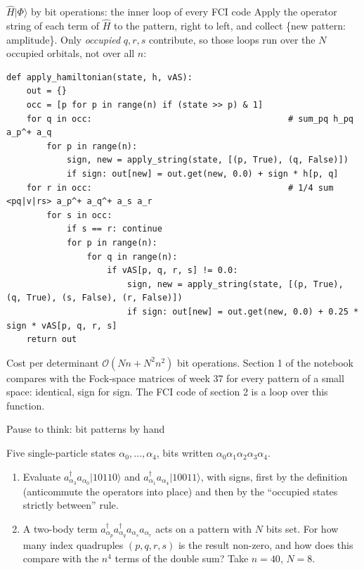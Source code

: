 \documentclass[aspectratio=169,10pt]{beamer}
\newcounter{thinkctr}
\newcommand{\thinkq}[2]{%
  \stepcounter{thinkctr}%
  \begin{tcolorbox}[colback=palewarm,colframe=warm,title={\bfseries Pause to think \#\thethinkctr\hfill\mdseries\small(about #1 min -- discuss with your neighbour)},fonttitle=\bfseries]
  #2
  \end{tcolorbox}}
\newcommand{\ket}[1]{\vert #1\rangle}
\begin{document}
\begin{frame}[fragile]{$\hat{H}\ket{\Phi}$ by bit operations: the inner loop of every FCI code}
  \small
  Apply the operator string of each term of $\hat{H}$ to the pattern, right to left, and collect \{new pattern: amplitude\}. Only \emph{occupied} $q,r,s$ contribute, so those loops run over the $N$ occupied orbitals, not over all $n$:
\begin{lstlisting}
def apply_hamiltonian(state, h, vAS):
    out = {}
    occ = [p for p in range(n) if (state >> p) & 1]
    for q in occ:                                       # sum_pq h_pq a_p^+ a_q
        for p in range(n):
            sign, new = apply_string(state, [(p, True), (q, False)])
            if sign: out[new] = out.get(new, 0.0) + sign * h[p, q]
    for r in occ:                                       # 1/4 sum <pq|v|rs> a_p^+ a_q^+ a_s a_r
        for s in occ:
            if s == r: continue
            for p in range(n):
                for q in range(n):
                    if vAS[p, q, r, s] != 0.0:
                        sign, new = apply_string(state, [(p, True), (q, True), (s, False), (r, False)])
                        if sign: out[new] = out.get(new, 0.0) + 0.25 * sign * vAS[p, q, r, s]
    return out
\end{lstlisting}
  Cost per determinant $\mathcal{O}(Nn+N^2n^2)$ bit operations. Section 1 of the notebook compares with the Fock-space matrices of week 37 for every pattern of a small space: identical, sign for sign. The FCI code of section 2 is a loop over this function.
\end{frame}

\begin{frame}{Pause to think: bit patterns by hand}
  \thinkq{4}{Five single-particle states $\alpha_0,\dots,\alpha_4$, bits written $\alpha_0\alpha_1\alpha_2\alpha_3\alpha_4$.
  \begin{enumerate}
    \item Evaluate $a^{\dagger}_{\alpha_3}a_{\alpha_0}\ket{10110}$ and $a^{\dagger}_{\alpha_1}a_{\alpha_4}\ket{10011}$, with signs, first by the definition (anticommute the operators into place) and then by the ``occupied states strictly between'' rule.
    \item A two-body term $a^{\dagger}_{\alpha_p}a^{\dagger}_{\alpha_q}a_{\alpha_s}a_{\alpha_r}$ acts on a pattern with $N$ bits set. For how many index quadruples $(p,q,r,s)$ is the result non-zero, and how does this compare with the $n^4$ terms of the double sum? Take $n=40$, $N=8$.
  \end{enumerate}}
\end{frame}
\end{document}
